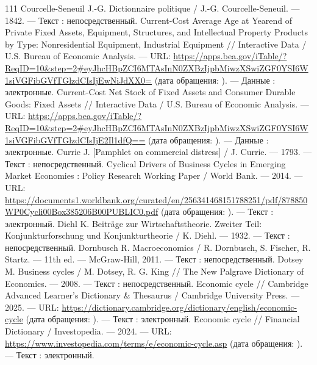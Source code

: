 \begin{RaggedRight}
\begin{thebibliography}{111}
     \hypertarget{bib:Courcelle-Seneuil-1842}{} Courcelle-Seneuil J.-G. Dictionnaire politique / J.-G. Courcelle-Seneuil. --- 1842. --- Текст : непосредственный.
     \hypertarget{bib:BEA-2.9}{} Current-Cost Average Age at Yearend of Private Fixed Assets, Equipment, Structures, and Intellectual Property Products by Type: Nonresidential Equipment, Industrial Equipment // Interactive Data / U.S. Bureau of Economic Analysis. --- URL: \url{https://apps.bea.gov/iTable/?ReqID=10&step=2#eyJhcHBpZCI6MTAsInN0ZXBzIjpbMiwzXSwiZGF0YSI6W1siVGFibGVfTGlzdCIsIjEwNiJdXX0=} (дата обращения: \bibaccessdate). --- Данные : электронные.
     \hypertarget{bib:BEA-1.1}{} Current-Cost Net Stock of Fixed Assets and Consumer Durable Goods: Fixed Assets // Interactive Data / U.S. Bureau of Economic Analysis. --- URL: \url{https://apps.bea.gov/iTable/?ReqID=10&step=2#eyJhcHBpZCI6MTAsInN0ZXBzIjpbMiwzXSwiZGF0YSI6W1siVGFibGVfTGlzdCIsIjE2Il1dfQ==} (дата обращения: \bibaccessdate). --- Данные : электронные.
     \hypertarget{bib:Currie-1793}{} Currie J. [Pamphlet on commercial distress] / J. Currie. --- 1793. --- Текст : непосредственный.
     \hypertarget{bib:WB-2014}{} Cyclical Drivers of Business Cycles in Emerging Market Economies : Policy Research Working Paper / World Bank. --- 2014. --- URL: \url{https://documents1.worldbank.org/curated/en/256341468151788251/pdf/878850WP0Cycli00Box385206B00PUBLIC0.pdf} (дата обращения: \bibaccessdate). --- Текст : электронный.
     \hypertarget{bib:Diehl-1932}{} Diehl K. Beiträge zur Wirtschaftstheorie. Zweiter Teil: Konjunkturforschung und Konjunkturtheorie / K. Diehl. --- 1932. --- Текст : непосредственный.
     \hypertarget{bib:Dornbusch-2011}{} Dornbusch R. Macroeconomics / R. Dornbusch, S. Fischer, R. Startz. --- 11th ed. --- McGraw-Hill, 2011. --- Текст : непосредственный.
     \hypertarget{bib:Dotsey-2008}{} Dotsey M. Business cycles / M. Dotsey, R. G. King // The New Palgrave Dictionary of Economics. --- 2008. --- Текст : непосредственный.
     \hypertarget{bib:Cambridge-2025}{} Economic cycle // Cambridge Advanced Learner’s Dictionary \& Thesaurus / Cambridge University Press. --- 2025. --- URL: \url{https://dictionary.cambridge.org/dictionary/english/economic-cycle} (дата обращения: \bibaccessdate). --- Текст : электронный.
     \hypertarget{bib:Investopedia-2024}{} Economic cycle // Financial Dictionary / Investopedia. --- 2024. --- URL: \url{https://www.investopedia.com/terms/e/economic-cycle.asp} (дата обращения: \bibaccessdate). --- Текст : электронный.

\end{thebibliography}
\end{RaggedRight}
